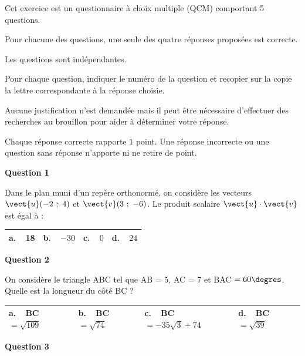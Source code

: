 \medskip

Cet exercice est un questionnaire à choix multiple (QCM) comportant 5 questions.

Pour chacune des questions, une seule des quatre réponses proposées est correcte.

Les questions sont indépendantes.

Pour chaque question, indiquer le numéro de la question et recopier sur la copie la lettre correspondante à la réponse choisie.

Aucune justification n'est demandée mais il peut être nécessaire d'effectuer des recherches au brouillon pour aider à déterminer votre réponse.

Chaque réponse correcte rapporte $1$ point. Une réponse incorrecte ou une question sans réponse n'apporte ni ne retire de point.

\medskip

\textbf{Question 1}

\medskip

Dans le plan muni d'un repère orthonormé, on considère les vecteurs $\vect{u}(-2~;~4)$ et $\vect{v}(3~;~-6)$. Le produit scalaire $\vect{u} \cdot \vect{v}$ est égal à :

\begin{center}
\begin{tabularx}{\linewidth}{|*{4}{X|}}\hline
\textbf{a.~~}18&\textbf{b.~~}$-30$&\textbf{c.~~}$0$&\textbf{d.~~}$24$\\ \hline
\end{tabularx}
\end{center}

\medskip

\textbf{Question 2}

\medskip

On considère le triangle ABC tel que AB = 5, AC = 7 et BAC $= 60\degres$. Quelle est la longueur du côté BC ?

\begin{center}
\begin{tabularx}{\linewidth}{|*{4}{X|}}\hline
\textbf{a.~~}BC$ = \sqrt{109}$ &\textbf{b.~~}BC$ = \sqrt{74}$&\textbf{c.~~}BC$= -35\sqrt{3} + 74$  &\textbf{d.~~}BC$= \sqrt{39}$\\ \hline
\end{tabularx}
\end{center}

\medskip

\textbf{Question 3}

\medskip

